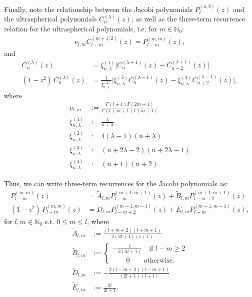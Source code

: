 \documentclass[11pt, oneside]{article}   	%
\newcommand{\No}{\mathbb{N}_0}
\newcommand{\Atilde}{\tilde{A}_{l,m}}
\newcommand{\Btilde}{\tilde{B}_{l,m}}
\newcommand{\Dtilde}{\tilde{D}_{l,m}}
\newcommand{\Etilde}{\tilde{E}_{l,m}}
\newcommand{\xione}{\xi^{(1)}_{n, \lambda}}
\newcommand{\xitwo}{\xi^{(2)}_{n, \lambda}}
\newcommand{\xithree}{\xi^{(3)}_{n, \lambda}}
\newcommand{\xifour}{\xi^{(4)}_{n, \lambda}}
\begin{document}
Finally, note the relationship between the Jacobi polynomials \(P^{(a,b)}_{l}(z)\) and the ultraspherical polynomials \(C^{(\lambda)}_{n}(z)\), as well as the three-term recurrence relation for the ultraspherical polynomials, i.e. for \(m \in \No\):
\begin{align}
\nu_{l,m} C^{(m+1/2)}_{l-m}(z) = P^{(m,m)}_{l-m}(z),
\end{align}
and
\begin{align}
C^{(\lambda)}_n(z) &= \xi^{(1)}_{n, \lambda} \big[ C^{(\lambda+1)}_n(z) - C^{(\lambda+1)}_{n-2}(z) \big]  \\
(1-z^2) \, C^{(\lambda)}_n(z) &= \frac{1}{\xi^{(2)}_{n, \lambda}} \big[ \xi^{(3)}_{n, \lambda} C^{(\lambda-1)}_n(z) - \xi^{(4)}_{n, \lambda}C^{(\lambda-1)}_{n+2}(z) \big] ,
\end{align}
where
\begin{align}
\nu_{l,m} &:= \frac{\Gamma(l+1)\Gamma(2m+1)}{\Gamma(l+m+1)\Gamma(m+1)} \\
\xione&:= \frac{\lambda}{n+\lambda} \\
\xitwo &:= 4(\lambda-1)(n+\lambda) \\
\xithree &:= (n+2\lambda-2)(n+2\lambda-1) \\
\xifour &:= (n+1)(n+2).
\end{align}

Thus, we can write three-term recurrences for the Jacobi polynomials as:
\begin{align}
P^{(m,m)}_{l-m}(z) &= \Atilde P^{(m+1,m+1)}_{l-m}(z) + \Btilde P^{(m+1,m+1)}_{l-m-2}(z) \\
(1-z^2) \, P^{(m,m)}_{l-m}(z) &= \Dtilde P^{(m-1,m-1)}_{l-m+2}(z) + \Etilde P^{(m-1,m-1)}_{l-m}(z),
\end{align}
for \(l, m \in \No\) s.t. \(0 \le m \le l\), where
\begin{align}
\Atilde &:= \frac{(l+m+2)(l+m+1)}{2(2l+1)(l+1)} \\
\Btilde &:= \begin{cases}
			- \frac{l}{2(2l+1)} \quad \text{if } l - m \ge 2 \\
			\quad \quad 0 \quad \quad \text{otherwise.}
		\end{cases} \\
\Dtilde &:= - \frac{2(l-m+2)(l-m+1)}{(2l+1)(l+1)} \\
\Etilde &:= \frac{2l}{2l+1} .
\end{align}
\end{document}
